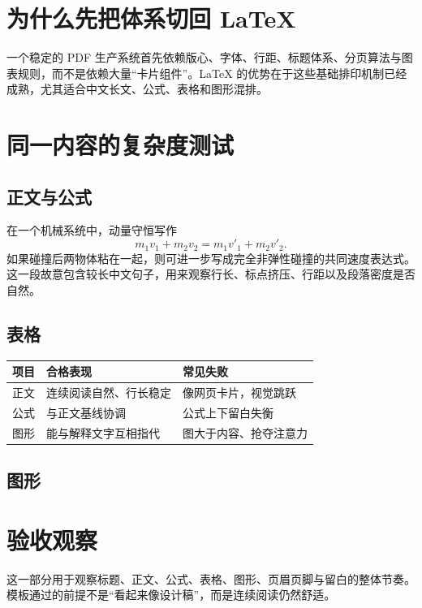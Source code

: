 \section{为什么先把体系切回 LaTeX}
一个稳定的 PDF 生产系统首先依赖版心、字体、行距、标题体系、分页算法与图表规则，而不是依赖大量“卡片组件”。LaTeX 的优势在于这些基础排印机制已经成熟，尤其适合中文长文、公式、表格和图形混排。


\section{同一内容的复杂度测试}
\subsection{正文与公式}
在一个机械系统中，动量守恒写作
\[
 m_1v_1+m_2v_2=m_1v'_1+m_2v'_2.
\]
如果碰撞后两物体粘在一起，则可进一步写成完全非弹性碰撞的共同速度表达式。这一段故意包含较长中文句子，用来观察行长、标点挤压、行距以及段落密度是否自然。

\subsection{表格}
\begin{center}
\begin{tabularx}{.94\linewidth}{@{}lXX@{}}
\toprule
项目 & 合格表现 & 常见失败 \\
\midrule
正文 & 连续阅读自然、行长稳定 & 像网页卡片，视觉跳跃 \\
公式 & 与正文基线协调 & 公式上下留白失衡 \\
图形 & 能与解释文字互相指代 & 图大于内容、抢夺注意力 \\
\bottomrule
\end{tabularx}
\end{center}

\subsection{图形}
\begin{center}
\end{center}

\section{验收观察}
这一部分用于观察标题、正文、公式、表格、图形、页眉页脚与留白的整体节奏。模板通过的前提不是“看起来像设计稿”，而是连续阅读仍然舒适。


